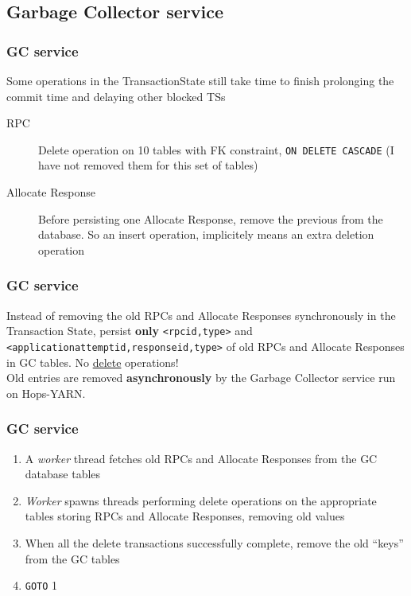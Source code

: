 \documentclass{beamer}
\begin{document}
\subsection{Garbage Collector service}
\begin{frame}
\frametitle{GC service}

Some operations in the TransactionState still take time to finish
prolonging the commit time and delaying other blocked TSs

\begin{description}
\item[RPC] Delete operation on 10 tables with FK constraint,
  \texttt{ON DELETE CASCADE} (I have not removed them for this set of tables)
\item[Allocate Response] Before persisting one Allocate Response,
  remove the previous from the database. So an insert operation,
  implicitely means an extra deletion operation
\end{description}
\end{frame}

\begin{frame}
\frametitle{GC service}

Instead of removing the old RPCs and Allocate Responses synchronously
in the Transaction State, persist \textbf{only} \texttt{<rpcid,type>}
and \texttt{<applicationattemptid,responseid,type>} of old RPCs and
Allocate Responses in GC tables. No \underline{delete} operations!\\[2em]

Old entries are removed \textbf{asynchronously} by the Garbage Collector
service run on Hops-YARN.
\end{frame}

\begin{frame}
\frametitle{GC service}

\begin{enumerate}
\item A \emph{worker} thread fetches old RPCs and Allocate Responses from the
  GC database tables

\item \emph{Worker} spawns threads performing delete operations on the
  appropriate tables storing RPCs and Allocate Responses, removing old
  values

\item When all the delete transactions successfully complete, remove
  the old ``keys'' from the GC tables

\item \texttt{GOTO} 1
\end{enumerate}
\end{frame}
\end{document}
